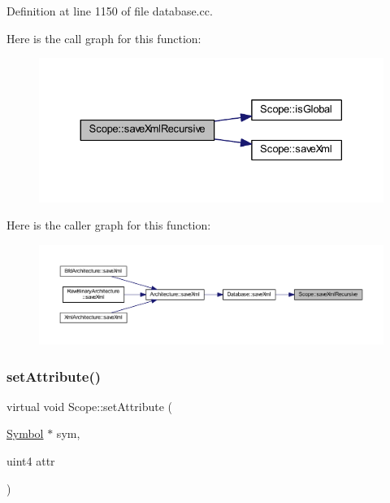 Definition at line 1150 of file database.\+cc.

Here is the call graph for this function\+:
\nopagebreak
\begin{figure}[H]
\begin{center}
\leavevmode
\includegraphics[width=330pt]{class_scope_a68c1f312cf9173871baa1b2fad29bb58_cgraph}
\end{center}
\end{figure}
Here is the caller graph for this function\+:
\nopagebreak
\begin{figure}[H]
\begin{center}
\leavevmode
\includegraphics[width=350pt]{class_scope_a68c1f312cf9173871baa1b2fad29bb58_icgraph}
\end{center}
\end{figure}
\mbox{\label{class_scope_a7a49f329dcfe47129bf11acac543233e}} 
\subsubsection{\texorpdfstring{setAttribute()}{setAttribute()}}
{\footnotesize\ttfamily virtual void Scope\+::set\+Attribute (\begin{DoxyParamCaption}\item[{\mbox{\hyperlink{class_symbol}{Symbol}} $\ast$}]{sym,  }\item[{uint4}]{attr }\end{DoxyParamCaption})\hspace{0.3cm}{\ttfamily [pure virtual]}}



